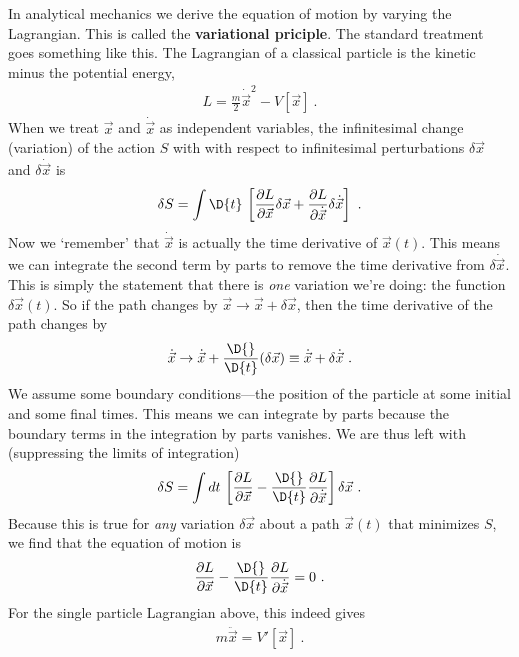 In analytical mechanics we derive the equation of motion by varying the Lagrangian. This is called the \textbf{variational priciple}. The standard treatment goes something like this. The Lagrangian of a classical particle is the kinetic minus the potential energy,
\begin{align}
    L = \frac{m}{2} \dot{\vec{x}}^2 - V[\vec{x}] \ .
\end{align}
When we treat $\vec{x}$ and $\dot{\vec{x}}$ as independent variables, the infinitesimal change (variation) of the action $S$ with with respect to infinitesimal perturbations $\delta\vec{x}$ and $\delta\dot{\vec{x}}$ is
\begin{align}
    \delta S =
    \int \D{t} \,
    \left[
    \frac{\partial L}{\partial \vec{x}} \delta\vec{x}
    +
    \frac{\partial L}{\partial \dot{\vec{x}}}\delta\dot{\vec{x}}
    \right] \ .
\end{align}
Now we `remember' that $\dot{\vec{x}}$ is actually the time derivative of $\vec{x}(t)$. This means we can integrate the second term by parts to remove the time derivative from $\delta\dot{\vec{x}}$. This is simply the statement that there is \emph{one} variation we're doing: the function $\delta\vec{x}(t)$. So if the path changes by $\vec{x}\to\vec{x}+\delta\vec{x}$, then the time derivative of the path changes by
\begin{align}
    \dot{\vec{x}} 
    \to \dot{\vec{x}} 
    + \frac{\D{}}{\D{t}}(\delta\vec{x}) 
    \equiv \dot{\vec{x}} + \delta\dot{\vec{x}} \ . 
\end{align}
% 
% 
We assume some boundary conditions---the position of the particle at some initial and some final times. This means we can integrate by parts because the boundary terms in the integration by parts vanishes.  We are thus left with (suppressing the limits of integration)
\begin{align}
    \delta S = \int dt\, 
    \left[
    \frac{\partial L}{\partial \vec{x}}
    - 
    \frac{\D{}}{\D{t}}
    \frac{\partial L}{\partial \dot{\vec{x}}} 
    \right]\delta\vec{x} \ .
\end{align}
Because this is true for \emph{any} variation $\delta\vec{x}$ about a path $\vec{x}(t)$ that minimizes $S$, we find that the equation of motion is 
\begin{align}
    \frac{\partial L}{\partial \vec{x}}
    - 
    \frac{\D{}}{\D{t}}
    \frac{\partial L}{\partial \dot{\vec{x}}}  = 0 \ .
\end{align}
For the single particle Lagrangian above, this indeed gives
\begin{align}
    m\ddot{\vec{x}} = V'[\vec{x}] \ .
\end{align}


